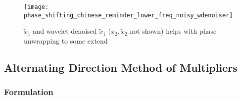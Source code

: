 \documentclass[../writeup.tex]{subfiles}
\begin{document}
\begin{figure}[h!]
    \begin{center}
        \texttt{[image: phase\_shifting\_chinese\_reminder\_lower\_freq\_noisy\_wdenoiser]}
    \end{center}
    \caption{$\tilde{x}_1$ and wavelet denoised $\tilde{x}_1$ ($x_2,\tilde{x}_2$ not shown) helps with phase unwrapping to some extend}
    \label{fig:phase_shifting_chinese_reminder_lower_freq_noisy_wdenoiser}
\end{figure}

\subsection{Alternating Direction Method of Multipliers}

\subsubsection{Formulation}
\end{document}
